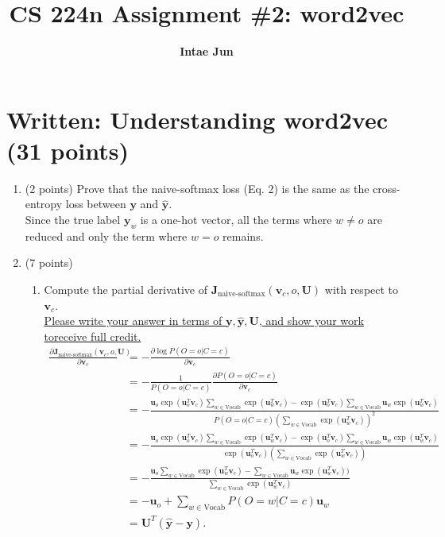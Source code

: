 \documentclass{article}
\title{CS 224n Assignment \#2: word2vec}
\author{\textbf{Intae Jun}}
\date{}
\begin{document}
\maketitle
\doublespacing

\section{Written: Understanding word2vec (31 points)}
\begin{enumerate}[label=(\alph*)]
    \item (2 points) Prove that the naive-softmax loss (Eq. 2) is the same as the cross-entropy loss between $\bm{y}$ and $\hat{\bm{y}}$.\\
    \noindent Since the true label $\bm{y}_w$ is a one-hot vector, all the terms where $w \ne o$ are reduced and only the term where $w=o$ remains.

    \item (7 points)
        \begin{enumerate}[label=(\roman*)]
            \item Compute the partial derivative of $\bm{J}_{\text{naive-softmax}}(\bm{v}_c, o, \bm{U})$ with respect to $\bm{v}_c$.\\
            \underline{Please write your answer in terms of $\bm{y}, \hat{\bm{y}}, \bm{U}$, and show your work toreceive full credit.}
            \begin{align*}
                \frac{\partial \bm{J}_{\text{naive-softmax}}(\bm{v}_c, o, \bm{U})}{\partial \bm{v}_c} &=
                -\frac{\partial \log P(O=o \vert C=c)}{\partial \bm{v}_c} \\
                &= -\frac{1}{P(O=o \vert C=c)} \frac{\partial P(O=o \vert C=c)}{\partial \bm{v}_c}\\
                &= -\frac{\bm{u}_o \exp(\bm{u}_o^T \bm{v}_c) \sum_{w\in\text{Vocab}}\exp(\bm{u}_w^T\bm{v}_c) - \exp(\bm{u}_o^T\bm{v}_c)\sum_{w \in \text{Vocab}} \bm{u}_w \exp(\bm{u}_w^T\bm{v}_c)}{P(O=o \vert C=c)(\sum_{w \in \text{Vocab}} \exp(\bm{u}_w^T\bm{v}_c))^2}\\
                &= -\frac{\bm{u}_o \exp(\bm{u}_o^T \bm{v}_c) \sum_{w\in\text{Vocab}}\exp(\bm{u}_w^T\bm{v}_c) - \exp(\bm{u}_o^T\bm{v}_c)\sum_{w \in \text{Vocab}} \bm{u}_w \exp(\bm{u}_w^T\bm{v}_c)}
                    {\exp(\bm{u}_o^T \bm{v}_c)(\sum_{w\in\text{Vocab}}\exp(\bm{u}_w^T\bm{v}_c))}\\
                &= - \frac{\bm{u}_o \sum_{w\in\text{Vocab}} \exp(\bm{u}_w^T\bm{v}_c) - \sum_{w\in\text{Vocab}} \bm{u}_w \exp(\bm{u}_w^T\bm{v}_c))}
                    {\sum_{w\in\text{Vocab}}\exp(\bm{u}_w^T\bm{v}_c)}\\
                &= -\bm{u}_o + \sum_{w\in\text{Vocab}} P(O=w \vert C=c) \bm{u}_w\\
                &= \bm{U}^T(\hat{\bm{y}} - \bm{y}).
            \end{align*}


\end{enumerate}
\end{enumerate}
\end{document}
